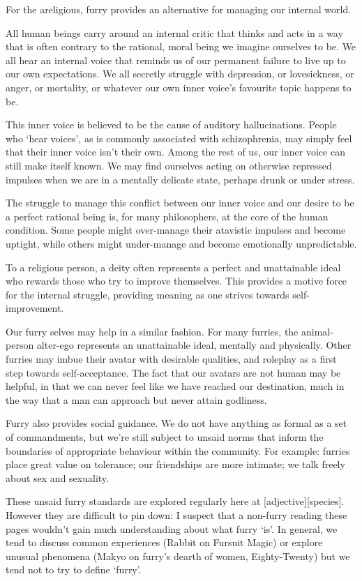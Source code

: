 For the areligious, furry provides an alternative for managing our internal world.

All human beings carry around an internal critic that thinks and acts in a way that is often contrary to the rational, moral being we imagine ourselves to be. We all hear an internal voice that reminds us of our permanent failure to live up to our own expectations. We all secretly struggle with depression, or lovesickness, or anger, or mortality, or whatever our own inner voice's favourite topic happens to be.

This inner voice is believed to be the cause of auditory hallucinations. People who `hear voices', as is commonly associated with schizophrenia, may simply feel that their inner voice isn't their own. Among the rest of us, our inner voice can still make itself known. We may find ourselves acting on otherwise repressed impulses when we are in a mentally delicate state, perhaps drunk or under stress.

The struggle to manage this conflict between our inner voice and our desire to be a perfect rational being is, for many philosophers, at the core of the human condition. Some people might over-manage their atavistic impulses and become uptight, while others might under-manage and become emotionally unpredictable.

To a religious person, a deity often represents a perfect and unattainable ideal who rewards those who try to improve themselves. This provides a motive force for the internal struggle, providing meaning as one strives towards self-improvement.

Our furry selves may help in a similar fashion. For many furries, the animal-person alter-ego represents an unattainable ideal, mentally and physically. Other furries may imbue their avatar with desirable qualities, and roleplay as a first step towards self-acceptance. The fact that our avatars are not human may be helpful, in that we can never feel like we have reached our destination, much in the way that a man can approach but never attain godliness.

Furry also provides social guidance. We do not have anything as formal as a set of commandments, but we're still subject to unsaid norms that inform the boundaries of appropriate behaviour within the community. For example: furries place great value on tolerance; our friendships are more intimate; we talk freely about sex and sexuality.

These unsaid furry standards are explored regularly here at [adjective][species]. However they are difficult to pin down: I suspect that a non-furry reading these pages wouldn't gain much understanding about what furry `is'. In general, we tend to discuss common experiences (Rabbit on Fursuit Magic) or explore unusual phenomena (Makyo on furry's dearth of women, Eighty-Twenty) but we tend not to try to define `furry'.

